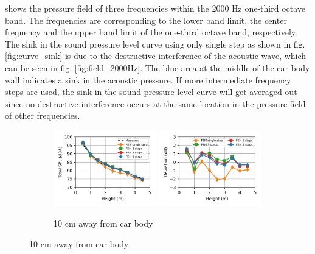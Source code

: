 \noindent{} shows the pressure field of three frequencies within the 2000 Hz one-third octave band. The frequencies are corresponding to the lower band limit, the center frequency and the upper band limit of the one-third octave band, respectively. The sink in the sound pressure level curve using only single step as shown in fig. \ref{fig:curve_sink} is due to the destructive interference of the acoustic wave, which can be seen in fig. \ref{fig:field_2000Hz}. The blue area at the middle of the car body wall indicates a sink in the acoustic pressure. If more intermediate frequency steps are used, the sink in the sound pressure level curve will get averaged out since no destructive interference occurs at the same location in the pressure field of other frequencies.

\begin{figure}
	\begin{subfigure}[b]{\textwidth}
		\centering
		\includegraphics[width=0.49\textwidth]{fig/chap5/freq_steps/overall_SPL/pos_a.png}
		\includegraphics[width=0.49\textwidth]{fig/chap5/freq_steps/overall_SPL/pos_a_deviation.png}
		\caption{10 cm away from car body}
	\end{subfigure}


\end{figure}

